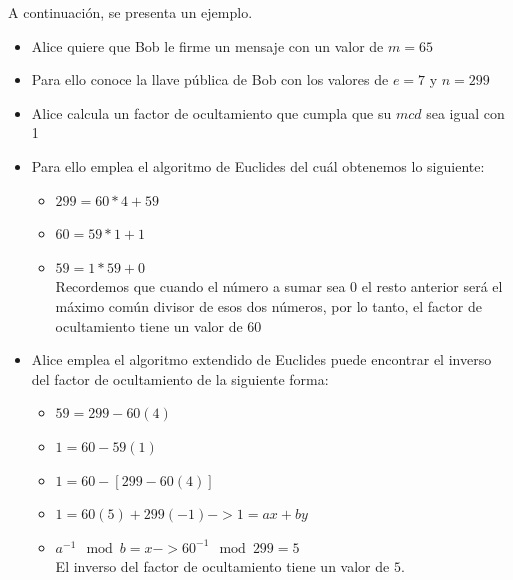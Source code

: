 A continuación, se presenta un ejemplo.
\begin{itemize}

\item Alice quiere que Bob le firme un mensaje con un valor de $ m = 65 $\\

\item Para ello conoce la llave pública de Bob con los valores de $ e = 7 $ y $ n = 299 $\\

\item Alice calcula un factor de ocultamiento que cumpla que su $mcd$ sea igual con 1\\

\item Para ello emplea el algoritmo de Euclides del cuál obtenemos lo siguiente: \\
\begin{itemize}

\item $ 299 = 60 * 4 + 59 $

\item $ 60 = 59 * 1 + 1 $

\item $ 59 = 1 * 59 + 0 $ \\

Recordemos que cuando el número a sumar sea 0 el resto anterior será el máximo común divisor de esos dos números, por lo tanto, el factor de ocultamiento tiene un valor de $60$ \\
\end{itemize}

\item Alice emplea el algoritmo extendido de Euclides puede encontrar el inverso del factor de ocultamiento de la siguiente forma:
\begin{itemize}

\item $ 59 = 299 - 60(4) $

\item $ 1 = 60 -59(1) $

\item $ 1 = 60 - [ 299 - 60(4) ] $

\item $ 1 = 60(5) + 299(-1) -> 1 = ax+ by $

\item $ a^{-1} \mod b = x -> 60^{-1} \mod 299 = 5 $ \\

El inverso del factor de ocultamiento tiene un valor de $ 5 $.


\end{itemize}
\end{itemize}
